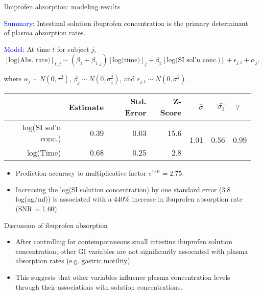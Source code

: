 \documentclass[]{beamer}
\begin{document}
\begin{frame}{Ibuprofen absorption: modeling results}

\textcolor{blue}{Summary}: Intestinal solution ibuprofen concentration is the primary determinant of plasma absorption rates.


\pause

\bigskip

\small
\textcolor{blue}{Model:} At time $t$ for subject $j$, $$[\text{log(Abs. rate)}]_{t,j} \sim (\beta_1 + \beta_{1,j})[\text{log(time)}]_j + \beta_2[\text{log(SI sol'n conc.)}] + \epsilon_{j,t} + \alpha_j,$$

where $\alpha_j \sim N(0, \tau^2)$, $\beta_j \sim N(0, \sigma_1^2)$, and $\epsilon_{j,t} \sim N(0, \sigma^2)$.%
\footnotesize
\begin{table}[ht]
\centering
\begin{tabular}{rrrr||rrr}
  \hline
 & Estimate & Std. Error & Z-Score & $\hat{\sigma}$ & $\hat{\sigma_1}$ & $\hat{\tau}$ \ \\ 
  \hline
	log(SI sol'n conc.) & 0.39 & 0.03 & 15.6 & \multirow{2}{*}{1.01}& \multirow{2}{*}{0.56}& \multirow{2}{*}{0.99} \\ 
	log(Time) & 0.68 & 0.25 & 2.8 & & &\\ 
   \hline
\end{tabular}
\end{table}

\small
\begin{itemize}
	\item Prediction accuracy to multiplicative factor $e^{1.01} = 2.75$.
	\item Increasing the log(SI solution concentration) by one standard error (3.8 log(ng/ml)) is associated with a 440\% increase in ibuprofen absorption rate (SNR = 1.60).
\end{itemize}

\end{frame}

\begin{frame}{Discussion of ibuprofen absorption}

\small

	\begin{itemize}
	\setlength\itemsep{1em}
		\item After controlling for contemporaneous small intestine ibuprofen solution concentration, other GI variables are not significantly associated with plasma absorption rates (e.g. gastric motility).

		\item This suggests that other variables influence plasma concentration levels through their associations with solution concentrations.

	\end{itemize}
\end{frame}
\end{document}
